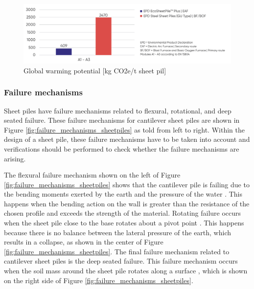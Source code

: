 \begin{figure}[H]
    \centering
    \includegraphics[width=0.90\linewidth]{figures/ch8/eaf_bof.png}
    \caption{Global warming potential [kg CO2e/t sheet pil] \autocite{arcelormittalGuidelinesSustainabilitySteel2024}}
    \label{fig:eaf_bof}
\end{figure}


\subsubsection{Failure mechanisms}

Sheet piles have failure mechanisms related to flexural, rotational, and deep seated failure. These failure mechanisms for cantilever sheet piles are shown in Figure \ref{fig:failure_mechanisms_sheetpiles} as told from left to right. Within the design of a sheet pile, these failure mechanisms have to be taken into account and verifications should be performed to check whether the failure mechanisms are arising.

The flexural failure mechanism shown on the left of Figure \ref{fig:failure_mechanisms_sheetpiles} shows that the cantilever pile is failing due to the bending moments exerted by the earth and the pressure of the water \autocite{brownDesignSheetPile1994}. This happens when the bending action on the wall is greater than the resistance of the chosen profile and exceeds the strength of the material. Rotating failure occurs when the sheet pile close to the base rotates about a pivot point \autocite{brownDesignSheetPile1994}. This happens because there is no balance between the lateral pressure of the earth, which results in a collapse, as shown in the center of Figure \ref{fig:failure_mechanisms_sheetpiles}. The final failure mechanism related to cantilever sheet piles is the deep seated failure. This failure mechanism occurs when the soil mass around the sheet pile rotates along a surface \autocite{brownDesignSheetPile1994}, which is shown on the right side of Figure \ref{fig:failure_mechanisms_sheetpiles}.

